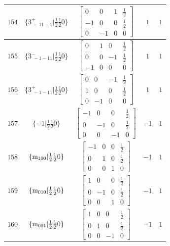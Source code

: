 \documentclass[fleqn,8pt]{jsarticle}
\begin{document}
\begin{longtable}{ccccc}
$ 154 $ & $ \{3^{+}_{\,\,-11-1}|\frac{1}{2} \frac{1}{2} 0\} $ & $ \begin{bmatrix} 0 & 0 & 1 & \frac{1}{2} \\ -1 & 0 & 0 & \frac{1}{2} \\ 0 & -1 & 0 & 0 \end{bmatrix} $ & $ 1 $ & $ 1 $ \\ \hline
$ 155 $ & $ \{3^{-}_{\,\,-1-11}|\frac{1}{2} \frac{1}{2} 0\} $ & $ \begin{bmatrix} 0 & 1 & 0 & \frac{1}{2} \\ 0 & 0 & -1 & \frac{1}{2} \\ -1 & 0 & 0 & 0 \end{bmatrix} $ & $ 1 $ & $ 1 $ \\ \hline
$ 156 $ & $ \{3^{+}_{\,\,-1-11}|\frac{1}{2} \frac{1}{2} 0\} $ & $ \begin{bmatrix} 0 & 0 & -1 & \frac{1}{2} \\ 1 & 0 & 0 & \frac{1}{2} \\ 0 & -1 & 0 & 0 \end{bmatrix} $ & $ 1 $ & $ 1 $ \\ \hline
$ 157 $ & $ \{-1|\frac{1}{2} \frac{1}{2} 0\} $ & $ \begin{bmatrix} -1 & 0 & 0 & \frac{1}{2} \\ 0 & -1 & 0 & \frac{1}{2} \\ 0 & 0 & -1 & 0 \end{bmatrix} $ & $ -1 $ & $ 1 $ \\ \hline
$ 158 $ & $ \{{\rm m}_{100}|\frac{1}{2} \frac{1}{2} 0\} $ & $ \begin{bmatrix} -1 & 0 & 0 & \frac{1}{2} \\ 0 & 1 & 0 & \frac{1}{2} \\ 0 & 0 & 1 & 0 \end{bmatrix} $ & $ -1 $ & $ 1 $ \\ \hline
$ 159 $ & $ \{{\rm m}_{010}|\frac{1}{2} \frac{1}{2} 0\} $ & $ \begin{bmatrix} 1 & 0 & 0 & \frac{1}{2} \\ 0 & -1 & 0 & \frac{1}{2} \\ 0 & 0 & 1 & 0 \end{bmatrix} $ & $ -1 $ & $ 1 $ \\ \hline
$ 160 $ & $ \{{\rm m}_{001}|\frac{1}{2} \frac{1}{2} 0\} $ & $ \begin{bmatrix} 1 & 0 & 0 & \frac{1}{2} \\ 0 & 1 & 0 & \frac{1}{2} \\ 0 & 0 & -1 & 0 \end{bmatrix} $ & $ -1 $ & $ 1 $ \\ \hline

\end{longtable}
\end{document}
